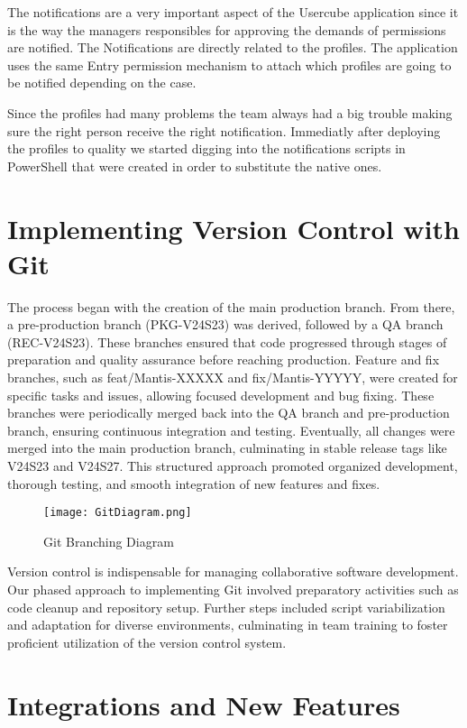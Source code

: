 The notifications are a very important aspect of the Usercube application since it is the way the managers responsibles for approving the demands of permissions are notified. The Notifications are directly related to the profiles. The application uses the same Entry permission mechanism to attach which profiles are going to be notified depending on the case.

Since the profiles had many problems the team always had a big trouble making sure the right person receive the right notification. Immediatly after deploying the profiles to quality we started digging into the notifications scripts in PowerShell that were created in order to substitute the native ones.

\section{Implementing Version Control with Git}

The process began with the creation of the main production branch. From there, a pre-production branch (PKG-V24S23) was derived, followed by a QA branch (REC-V24S23). These branches ensured that code progressed through stages of preparation and quality assurance before reaching production. Feature and fix branches, such as feat/Mantis-XXXXX and fix/Mantis-YYYYY, were created for specific tasks and issues, allowing focused development and bug fixing. These branches were periodically merged back into the QA branch and pre-production branch, ensuring continuous integration and testing. Eventually, all changes were merged into the main production branch, culminating in stable release tags like V24S23 and V24S27. This structured approach promoted organized development, thorough testing, and smooth integration of new features and fixes.

\begin{figure}
    \centering
    \texttt{[image: GitDiagram.png]}
    \caption{Git Branching Diagram}
    \label{fig:git-diagram}
\end{figure}

Version control is indispensable for managing collaborative software development. Our phased approach to implementing Git involved preparatory activities such as code cleanup and repository setup. Further steps included script variabilization and adaptation for diverse environments, culminating in team training to foster proficient utilization of the version control system.

\section{Integrations and New Features}


